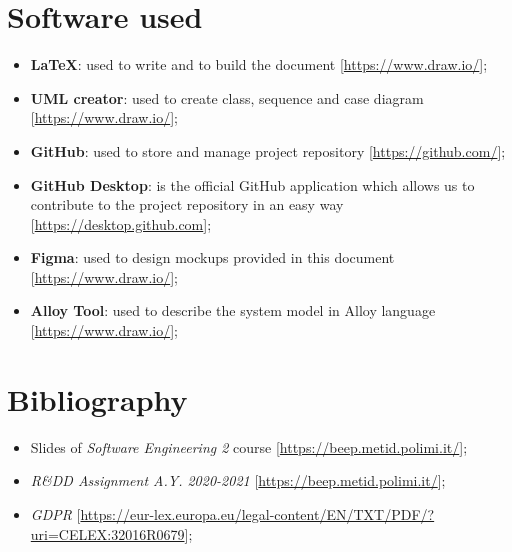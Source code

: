 \section{Software used}

\begin{itemize}
\item \textbf{\LaTeX}: used to write and to build the document [\url{https://www.draw.io/}];
\item\textbf{UML creator}: used to create class, sequence and case diagram [\url{https://www.draw.io/}];
\item\textbf{GitHub}: used to store and manage project repository [\url{https://github.com/}];
\item\textbf{GitHub Desktop}: is the official GitHub application which allows us to contribute to the project repository in an easy way [\url{https://desktop.github.com}];
\item\textbf{Figma}: used to design mockups provided in this document [\url{https://www.draw.io/}];
\item\textbf{Alloy Tool}: used to describe the system model in Alloy language [\url{https://www.draw.io/}];
\begin{comment}
\item\textbf{}:;
\item\textbf{}:;
\item\textbf{}:;
\end{comment}
\end{itemize}



\section{Bibliography}
\begin{itemize}
\item Slides of \textit{Software Engineering 2} course [\url{https://beep.metid.polimi.it/}];
\item \textit{R\&DD Assignment A.Y. 2020-2021} 
[\url{https://beep.metid.polimi.it/}];
\item \textit{GDPR} 
[\url{https://eur-lex.europa.eu/legal-content/EN/TXT/PDF/?uri=CELEX:32016R0679}]; 
\end{itemize}

